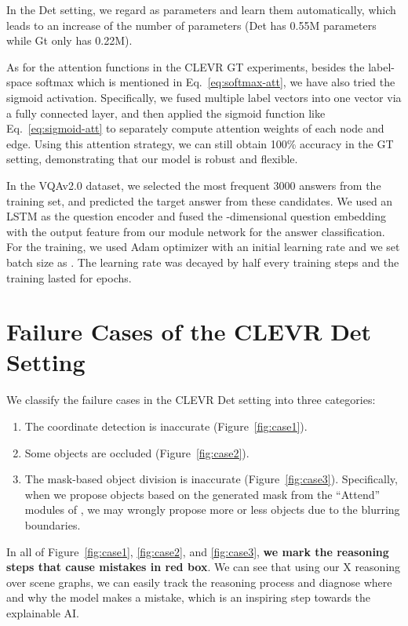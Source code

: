 \documentclass[10pt,twocolumn,letterpaper]{article}
\begin{document}
In the Det setting, we regard  as parameters and learn them automatically, which leads to an increase of the number of parameters (Det has 0.55M parameters while Gt only has 0.22M).

As for the attention functions in the CLEVR GT experiments, besides the label-space softmax which is mentioned in Eq.~\ref{eq:softmax-att}, we have also tried the sigmoid activation. Specifically, we fused multiple label vectors into one vector via a fully connected layer, and then applied the sigmoid function like Eq.~\ref{eq:sigmoid-att} to separately compute attention weights of each node and edge. Using this attention strategy, we can still obtain 100\% accuracy in the GT setting, demonstrating that our model is robust and flexible.

In the VQAv2.0 dataset, we selected the most frequent 3000 answers from the training set, and predicted the target answer from these candidates.
We used an LSTM as the question encoder and fused the -dimensional question embedding with the output feature from our module network for the answer classification.
For the training, we used Adam optimizer with an initial learning rate  and we set batch size as .
The learning rate was decayed by half every  training steps and the training lasted for  epochs.




\section{Failure Cases of the CLEVR Det Setting}
We classify the failure cases in the CLEVR Det setting into three categories:
\begin{enumerate}
    \item The coordinate detection is inaccurate (Figure~\ref{fig:case1}).
    \item Some objects are occluded (Figure~\ref{fig:case2}).
    \item The mask-based object division is inaccurate (Figure~\ref{fig:case3}). Specifically, when we propose objects based on the generated mask from the ``Attend'' modules of \cite{mascharka2018transparency}, we may wrongly propose more or less objects due to the blurring boundaries.
\end{enumerate}
In all of Figure~\ref{fig:case1}, \ref{fig:case2}, and \ref{fig:case3}, \textbf{we mark the reasoning steps that cause mistakes in red box}.
We can see that using our X reasoning over scene graphs, we can easily track the reasoning process and diagnose where and why the model makes a mistake, which is an inspiring step towards the explainable AI.
\end{document}
